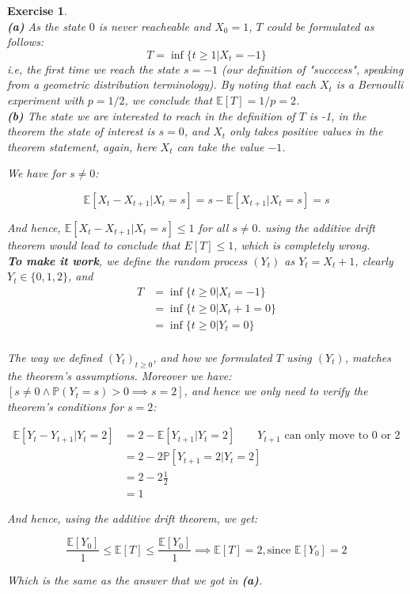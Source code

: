 \documentclass{article}
\newtheorem{exo}{Exercise}
\def\P{\mathbb{P}}
\def\E{\mathbb{E}}
\begin{document}
\begin{exo}{\ \\}
\noindent
\textbf{(a)} As the state $0$ is never reacheable and $X_0 = 1$, $T$ could be formulated as follows: \[T = \inf\{t \geq 1 | X_t = -1 \} \] i.e, the first time we reach the state $s = -1$ (our definition of "succcess", speaking from a geometric distribution terminology). By noting that each $X_t$ is a Bernoulli experiment with $p =1/2$, we conclude that $\E[T] = 1/p = 2$. \\

\noindent
\textbf{(b)} The state we are interested to reach in the definition of $T$ is -1, in the theorem the state of interest is $s = 0$, and $X_t$ only takes positive values in the theorem statement, again, here $X_t$ can take the value $-1$.

We have for $s \neq 0$:

\[ \E[X_t - X_{t+1} | X_t =s] =  s - \E[X_{t+1}|X_t = s] = s \]

And hence, $\E[X_t - X_{t+1}| X_t = s] \leq 1$ for all $s \neq 0$. using the additive drift theorem would lead to conclude that $E[T] \leq 1$, which is completely wrong. \\

\textbf{To make it work}, we define the random process $(Y_t)$ as $Y_t = X_t +1$, clearly $Y_t \in \{0, 1, 2\}$, and 
\begin{align*}
    T 
    &= \inf\{ t \geq 0 | X_t = -1\} \\
    &= \inf\{ t \geq 0 | X_t+ 1 = 0\} \\
    &= \inf\{ t \geq 0 | Y_t = 0\} \\ 
\end{align*}

The way we defined $(Y_t)_{t\geq0}$, and how we formulated $T$ using $(Y_t)$, matches the theorem's assumptions. Moreover we have:
$[s \neq 0 \land \P(Y_t = s)> 0 \implies s=2]$, and hence we only need to verify the theorem's conditions for $s=2$:

\begin{align*}
    \E[Y_t - Y_{t+1}| Y_t  = 2] 
        &= 2 - \E[Y_{t+1}|Y_t = 2] 
        \quad \quad \text{$Y_{t+1}$ can only move to 0 or 2}\\
        &= 2 - 2\P[Y_{t+1}=2|Y_t = 2] \\
        &= 2 - 2 \frac{1}{2} \\ 
        &= 1
\end{align*}

And hence, using the additive drift theorem, we get:

\[  \frac{\E[Y_0]}{1} \leq \E[T] \leq \frac{\E[Y_0]}{1} \implies  \E[T] =  2, \text{since $\E[Y_0]=2$} \]

Which is the same as the answer that we got in \textbf{(a)}. 


\end{exo}
\end{document}
